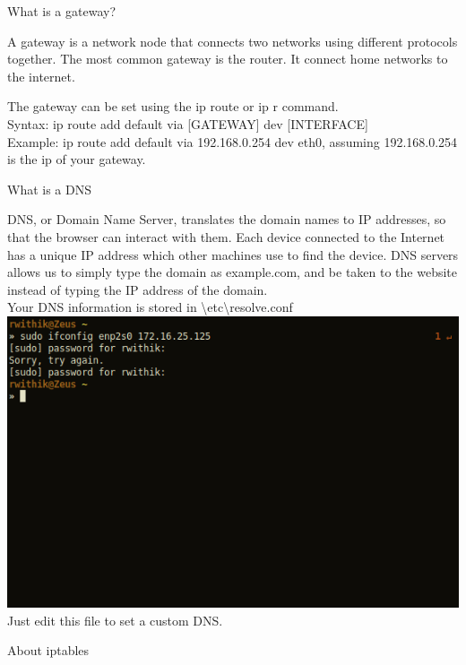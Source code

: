 \documentclass[10pt,a4paper]{report}
\begin{document}
\begin{flushleft}
\pagebreak
\vspace*{\fill}
\begin{center}
\begin{large}
What is a gateway?
\end{large}
\end{center}

A gateway is a network node that connects two networks using different protocols together. The most common gateway is the router. It connect home networks to the internet.
\par The gateway can be set using the {\color{red} ip route} or {\color{red} ip r} command.\\

Syntax: ip route add default via [GATEWAY] dev [INTERFACE]\\

Example: ip route add default via 192.168.0.254 dev eth0, assuming 192.168.0.254 is the ip of your gateway.
\vspace*{\fill}
\pagebreak
\vspace*{\fill}
\begin{center}
\begin{large}
What is a DNS
\end{large}
\end{center}

DNS, or Domain Name Server, translates the domain names to IP addresses, so that the browser can interact with them. Each device connected to the Internet has a unique IP address which other machines use to find the device. DNS servers allows us to simply type the domain as example.com, and be taken to the website instead of typing the IP address of the domain.\\
\medskip
Your DNS information is stored in {\color{blue} \textbackslash{}etc\textbackslash{}resolve.conf}\\
\includegraphics[scale=.5]{../Images/Network/5.png}\\ 
\medskip 
Just edit this file to set a custom DNS.
\vspace*{\fill}
\pagebreak
\vspace*{\fill}
\begin{center}
\begin{Large}
About iptables
\end{Large}
\end{center}


\end{flushleft}
\end{document}
